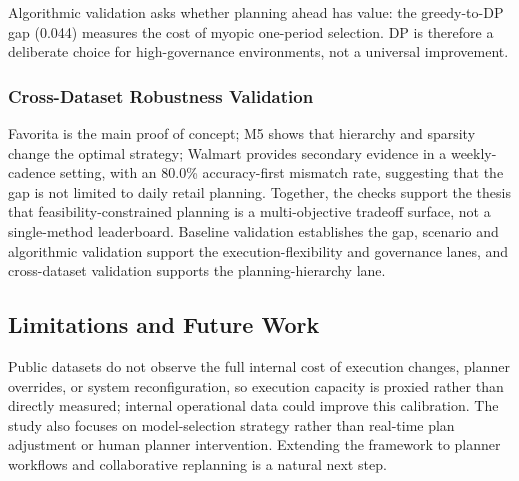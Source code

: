 Algorithmic validation asks whether planning ahead has value: the greedy-to-DP gap (0.044) measures the cost of myopic one-period selection. DP is therefore a deliberate choice for high-governance environments, not a universal improvement.

\subsubsection{Cross-Dataset Robustness Validation}

Favorita is the main proof of concept; M5 shows that hierarchy and sparsity change the optimal strategy; Walmart provides secondary evidence in a weekly-cadence setting, with an 80.0\% accuracy-first mismatch rate, suggesting that the gap is not limited to daily retail planning. Together, the checks support the thesis that feasibility-constrained planning is a multi-objective tradeoff surface, not a single-method leaderboard. Baseline validation establishes the gap, scenario and algorithmic validation support the execution-flexibility and governance lanes, and cross-dataset validation supports the planning-hierarchy lane.

\subsection{Limitations and Future Work}

Public datasets do not observe the full internal cost of execution changes, planner overrides, or system reconfiguration, so execution capacity is proxied rather than directly measured; internal operational data could improve this calibration. The study also focuses on model-selection strategy rather than real-time plan adjustment or human planner intervention. Extending the framework to planner workflows and collaborative replanning is a natural next step.
